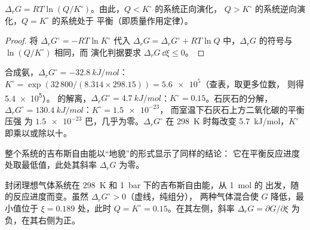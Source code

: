 \begin{corollary}[本科一年级分册中的定律]\label{cor:b2:equilibrium-shifts:mass-action}
$\Delta_r G = RT\ln(Q/K^\circ)$。由此，$Q < K^\circ$ 的系统正向演化，
$Q > K^\circ$ 的系统逆向演化，$Q = K^\circ$ 的系统处于
平衡（即质量作用定律）。
\end{corollary}

\begin{proof}
将 $\Delta_r G^\circ = -RT\ln K^\circ$ 代入 $\Delta_r G = \Delta_r G^\circ
+ RT\ln Q$ 中，$\Delta_r G$ 的符号与 $\ln(Q/K^\circ)$ 相同，而
演化判据要求 $\Delta_r G\,\dd\xi \leq 0$。
\end{proof}

\begin{example}\label{ex:b2:equilibrium-shifts:constants}
合成氨，$\Delta_r G^\circ = \qty{-32.8}{kJ/mol}$：$K^\circ =
\exp(32\,800/(8.314 \times 298.15)) = \num{5.6e5}$（查表，取更多位数，
则得 \num{5.4e5}）。 的解离，$\Delta_r G^\circ =
\qty{+4.7}{kJ/mol}$：$K^\circ = 0.15$。石灰石的分解，
$\Delta_r G^\circ = \qty{+130.4}{kJ/mol}$：$K^\circ = \num{1.5e-23}$，
而室温下石灰石上方二氧化碳的平衡压强
为 $\num{1.5e-23}$ 巴，几乎为零。$\Delta_r G^\circ$ 在 \qty{298}{K} 时每改变
\qty{5.7}{kJ/mol}，$K^\circ$ 即乘以或除以十。
\end{example}

整个系统的吉布斯自由能以“地貌”的形式显示了同样的结论：
它在平衡反应进度处取最低值，此处其斜率 $\Delta_r G$
为零。

\begin{omfigure}

{\small 封闭理想气体系统在 \qty{298}{K} 和
\qty{1}{bar} 下的吉布斯自由能，从 \qty{1}{mol} 的  出发，随
 的反应进度而变。虽然 $\Delta_r G^\circ > 0$（虚线，纯组分），
两种气体混合使 $G$ 降低，最小值位于 $\xi =
0.189$ 处，此时 $Q = K^\circ = 0.15$。在其左侧，斜率 $\Delta_r G =
\partial G/\partial\xi$ 为负，在其右侧为正。}
\end{omfigure}

